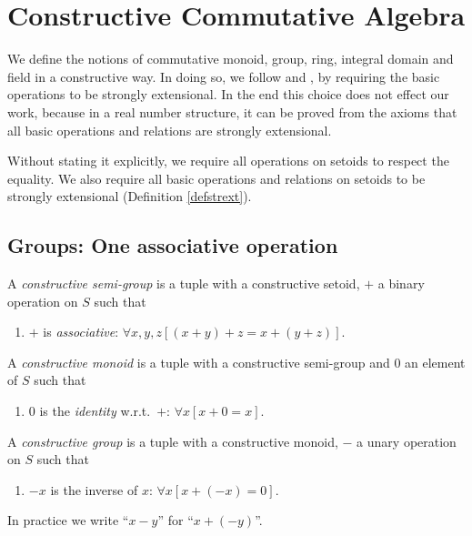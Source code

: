\section{Constructive Commutative Algebra}
We define the notions of commutative monoid, group, ring, integral
domain and field in a constructive way. In doing so, we follow
\cite{Ruit82} and \cite{TvD882}, by requiring the basic operations to
be strongly extensional. In the end this choice does not effect our
work, because in a real number structure, it can be proved from the
axioms that all basic operations and relations are strongly
extensional.

\begin{convention}\label{convstrext}
Without stating it explicitly, we require all operations on setoids to respect
the equality.
We also require all basic operations and relations on setoids to be
strongly extensional (Definition \ref{defstrext}).
\end{convention}

\subsection{Groups: One associative operation}
\begin{definition}\label{defsemigrp}
A {\em constructive semi-group\/} is a tuple  with
 a constructive setoid, $+$ a binary operation on
$S$ such that
  \begin{enumerate}
  \item $+$ is {\em associative}: $\forall x, y,z[(x+y)+z = x+(y+z)]$.
   \end{enumerate}
\end{definition}

\begin{definition}\label{defmonoid}
A {\em constructive monoid\/} is a tuple  with
 a constructive semi-group and $0$ an element of
$S$ such that
  \begin{enumerate}
  \item $0$ is the {\em identity\/} w.r.t.\ $+$: $\forall x[x+0=x]$.
  \end{enumerate}
\end{definition}

\begin{definition}\label{defgroup}
  A {\em constructive group\/} is a tuple 
  with  a constructive monoid, $-$ a unary
  operation on $S$ such that 
\begin{enumerate} 
\item $-x$ is the inverse of $x$: $\forall x[x+(-x)=0]$.
\end{enumerate}
In practice we write ``$x-y$'' for ``$x+(-y)$''.
\end{definition}


